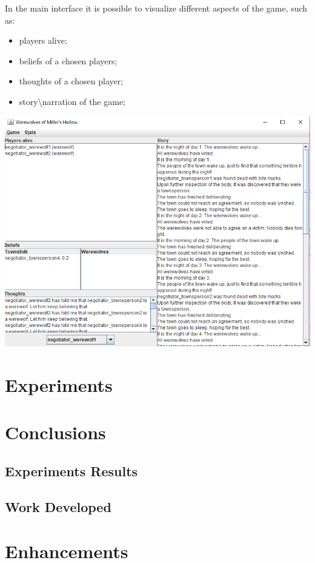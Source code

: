 \documentclass{article}
\begin{document}
In the main interface it is possible to visualize different aspects of the game, such as:
\begin{itemize}
	\item players alive;
	\item beliefs of a chosen players;
	\item thoughts of a chosen player;
	\item story\textbackslash narration of the game;
\end{itemize}
\begin{center}
\includegraphics[width=1\textwidth]{./images/gui.png}\par\vspace{1cm}
\end{center}

\section{Experiments}

\section{Conclusions}
\subsection{Experiments Results}
\subsection{Work Developed}
\section{Enhancements}
\end{document}
